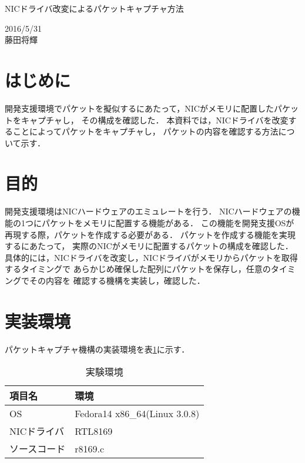 \documentclass[12pt]{jsarticle}
\begin{document}

\begin{center}
    {\LARGE NICドライバ改変によるパケットキャプチャ方法}
\end{center}

\begin{flushright}
    2016/5/31\\
    藤田将輝
\end{flushright}
\section{はじめに}
開発支援環境でパケットを擬似するにあたって，NICがメモリに配置したパケットをキャプチャし，
その構成を確認した．
本資料では，NICドライバを改変することによってパケットをキャプチャし，
パケットの内容を確認する方法について示す．

\section{目的}
開発支援環境はNICハードウェアのエミュレートを行う．
NICハードウェアの機能の1つにパケットをメモリに配置する機能がある．
この機能を開発支援OSが再現する際，パケットを作成する必要がある．
パケットを作成する機能を実現するにあたって，
実際のNICがメモリに配置するパケットの構成を確認した．
具体的には，NICドライバを改変し，NICドライバがメモリからパケットを取得するタイミングで
あらかじめ確保した配列にパケットを保存し，任意のタイミングでその内容を
確認する機構を実装し，確認した．

\section{実装環境}
パケットキャプチャ機構の実装環境を表\ref{kankyou}に示す．

\begin{table}[htbp]
    \caption{実験環境}
    \label{kankyou}
    \begin{center}
        \begin{tabular}{l|l}   \hline \hline 
            項目名      & 環境    \\ \hline
            OS          & Fedora14 x86\_64(Linux 3.0.8)  \\ 
            NICドライバ & RTL8169    \\ 
            ソースコード& r8169.c \\ \hline
        \end{tabular}
    \end{center}
\end{table}
\end{document}
